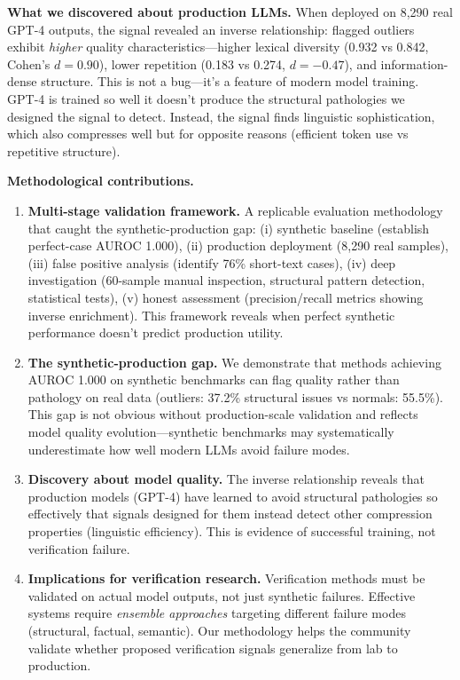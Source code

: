\documentclass[11pt]{article}
\begin{document}
\textbf{What we discovered about production LLMs.} When deployed on 8,290 real GPT-4 outputs, the signal revealed an inverse relationship: flagged outliers exhibit \textit{higher} quality characteristics---higher lexical diversity (0.932 vs 0.842, Cohen's $d=0.90$), lower repetition (0.183 vs 0.274, $d=-0.47$), and information-dense structure. This is not a bug---it's a feature of modern model training. GPT-4 is trained so well it doesn't produce the structural pathologies we designed the signal to detect. Instead, the signal finds linguistic sophistication, which also compresses well but for opposite reasons (efficient token use vs repetitive structure).

\textbf{Methodological contributions.}
\begin{enumerate}
\item \textbf{Multi-stage validation framework.} A replicable evaluation methodology that caught the synthetic-production gap: (i) synthetic baseline (establish perfect-case AUROC 1.000), (ii) production deployment (8,290 real samples), (iii) false positive analysis (identify 76\% short-text cases), (iv) deep investigation (60-sample manual inspection, structural pattern detection, statistical tests), (v) honest assessment (precision/recall metrics showing inverse enrichment). This framework reveals when perfect synthetic performance doesn't predict production utility.

\item \textbf{The synthetic-production gap.} We demonstrate that methods achieving AUROC 1.000 on synthetic benchmarks can flag quality rather than pathology on real data (outliers: 37.2\% structural issues vs normals: 55.5\%). This gap is not obvious without production-scale validation and reflects model quality evolution---synthetic benchmarks may systematically underestimate how well modern LLMs avoid failure modes.

\item \textbf{Discovery about model quality.} The inverse relationship reveals that production models (GPT-4) have learned to avoid structural pathologies so effectively that signals designed for them instead detect other compression properties (linguistic efficiency). This is evidence of successful training, not verification failure.

\item \textbf{Implications for verification research.} Verification methods must be validated on actual model outputs, not just synthetic failures. Effective systems require \textit{ensemble approaches} targeting different failure modes (structural, factual, semantic). Our methodology helps the community validate whether proposed verification signals generalize from lab to production.
\end{enumerate}
\end{document}
